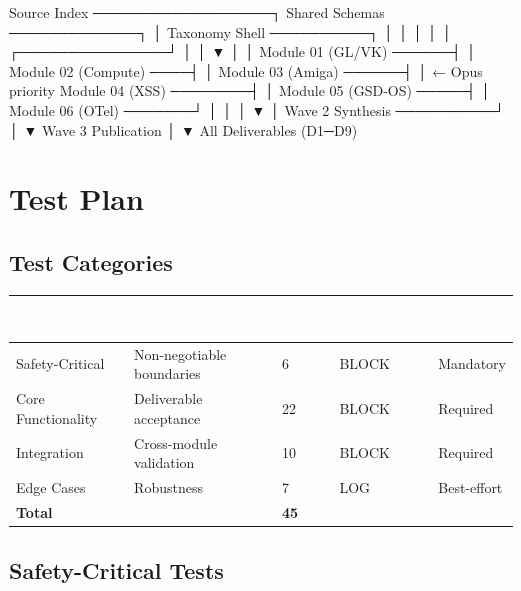 \documentclass[11pt,letterpaper]{article}
\newcommand{\tableheader}[1]{\textbf{\sffamily\textcolor{white}{#1}}}
\begin{document}
\begin{asciibox}
Source Index ──────────────────┐
Shared Schemas ─────────────┐  │
Taxonomy Shell ──────────┐  │  │
                         │  │  │
         ┌───────────────┘  │  │
         ▼                  │  │
    Module 01 (GL/VK) ──────┤  │
    Module 02 (Compute) ────┤  │
    Module 03 (Amiga) ──────┤  │  ← Opus priority
    Module 04 (XSS) ────────┤  │
    Module 05 (GSD-OS) ─────┤  │
    Module 06 (OTel) ───────┘  │
         │                     │
         ▼                     │
    Wave 2 Synthesis ──────────┘
         │
         ▼
    Wave 3 Publication
         │
         ▼
    All Deliverables (D1─D9)
\end{asciibox}

\section{Test Plan}

\subsection{Test Categories}

\begin{center}
\begin{tabularx}{\textwidth}{L{3cm}XC{2cm}C{2.5cm}C{1.5cm}}
\toprule
{}
\tableheader{Category} & \tableheader{Purpose} & \tableheader{Count} & \tableheader{Failure Action} & \tableheader{Priority} \\
\midrule
Safety-Critical & Non-negotiable boundaries & 6 & BLOCK & Mandatory \\
Core Functionality & Deliverable acceptance & 22 & BLOCK & Required \\
Integration & Cross-module validation & 10 & BLOCK & Required \\
Edge Cases & Robustness & 7 & LOG & Best-effort \\
\textbf{Total} & & \textbf{45} & & \\
\bottomrule
\end{tabularx}
\end{center}

\subsection{Safety-Critical Tests}
\end{document}
